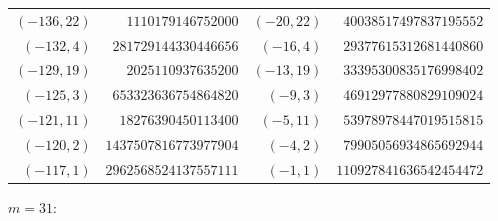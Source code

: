 {\begin{tabular}{@{}r@{\ \ }r@{\qquad}r@{\ \ }r@{}}
$(-136,22)$ & $1110179146752000$ & $(-20,22)$ & $40038517497837195552$ \\
$(-132,4)$ & $281729144330446656$ & $(-16,4)$ & $29377615312681440860$ \\
$(-129,19)$ & $2025110937635200$ & $(-13,19)$ & $33395300835176998402$ \\
$(-125,3)$ & $653323636754864820$ & $(-9,3)$ & $46912977880829109024$ \\
$(-121,11)$ & $18276390450113400$ & $(-5,11)$ & $53978978447019515815$ \\
$(-120,2)$ & $1437507816773977904$ & $(-4,2)$ & $79905056934865692944$ \\
$(-117,1)$ & $2962568524137557111$ & $(-1,1)$ & $110927841636542454472$ \\
\end{tabular}}\par\medskip
\noindent$m=31$:\nopagebreak\\[2pt]
